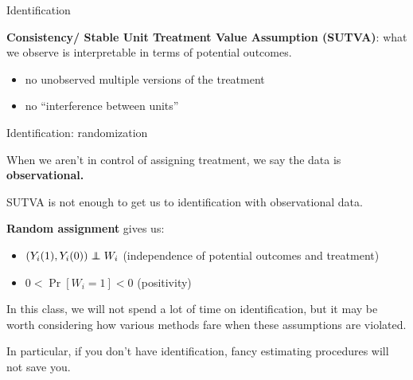 \documentclass[xcolor={dvipsnames}, handout]{beamer}
\begin{document}

\begin{frame}{Identification}

\begin{wideitemize}
\item \textbf{Consistency/ Stable Unit Treatment Value Assumption (SUTVA)}: what we observe is interpretable in terms of potential outcomes. \pause
\begin{itemize}
\item no unobserved multiple versions of the treatment
\item no ``interference between units''
\end{itemize}
\end{wideitemize}

\end{frame}



\begin{frame}{Identification: randomization}

\begin{wideitemize}
\item When we aren't in control of assigning treatment, we say the data is \textbf{observational.}
\item SUTVA is not enough to get us to identification with observational data. \pause
\item \textbf{Random assignment} gives us:  \pause
\begin{itemize}
\item $(Y_i(1), Y_i(0)) \independent W_i$ (independence of potential outcomes and treatment)
\item $0< \Pr[W_i = 1] <0$ (positivity)\pause
\end{itemize}
\item In this class, we will not spend a lot of time on identification, but it may be worth considering how various methods fare when these assumptions are violated. \pause
\item In particular, if you don't have identification, fancy estimating procedures will not save you. 
\end{wideitemize}

\end{frame}
\end{document}

